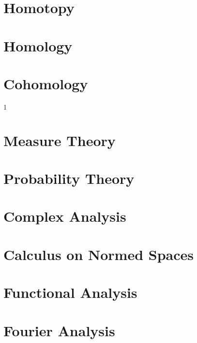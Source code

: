 \documentclass{book}                                                           %
\newcommand*{\TOPPATH}{books}
\newcommand*{\PATH}{\TOPPATH/}
\newcounter{endpage}
\def\compileanalysis{0}
\begin{document}
            \part{Homotopy}
                
            \part{Homology}
            \part{Cohomology}
        \clearpage
        \setcounter{endpage}{\thepage}
    \fi

    \if\compileanalysis1
            \label{book:Analysis}%
            \renewcommand{\PATH}{\TOPPATH/Analysis}
            \setcounter{page}{\value{endpage}}
            \part{Measure Theory}
                
            \part{Probability Theory}
                
            \part{Complex Analysis}
                
            \part{Calculus on Normed Spaces}
                
            \part{Functional Analysis}
                
            \part{Fourier Analysis}
                
                
\end{document}
